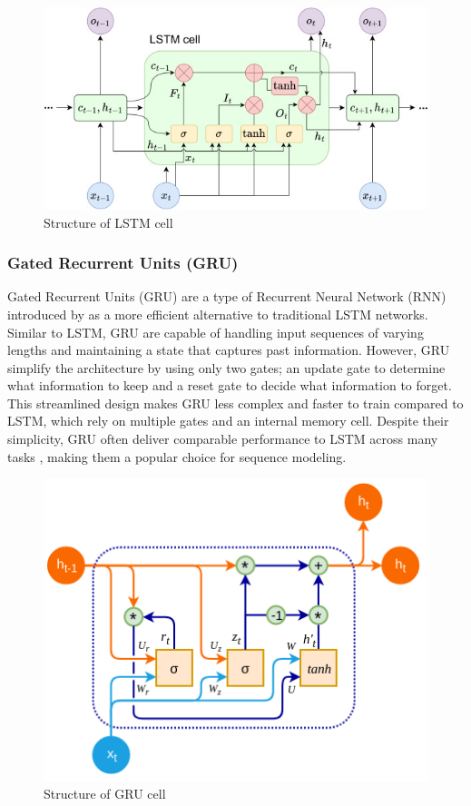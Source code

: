 \documentclass[]{interact}
\theoremstyle{plain}%
\theoremstyle{definition}
\theoremstyle{remark}
\begin{document}
\begin{figure}

{\centering \includegraphics[width=0.75\linewidth]{lstm} 

}

\caption{Structure of LSTM cell}\label{fig:figlstm}
\end{figure}

\subsubsection{Gated Recurrent Units
(GRU)}\label{gated-recurrent-units-gru}

Gated Recurrent Units (GRU) are a type of Recurrent Neural Network (RNN)
introduced by \citep{chung2014} as a more efficient alternative to
traditional LSTM networks. Similar to LSTM, GRU are capable of handling
input sequences of varying lengths and maintaining a state that captures
past information. However, GRU simplify the architecture by using only
two gates; an update gate to determine what information to keep and a
reset gate to decide what information to forget. This streamlined design
makes GRU less complex and faster to train compared to LSTM, which rely
on multiple gates and an internal memory cell. Despite their simplicity,
GRU often deliver comparable performance to LSTM across many tasks
\citep{yang2020}, making them a popular choice for sequence modeling.

\begin{figure}

{\centering \includegraphics[width=0.75\linewidth]{GRU} 

}

\caption{Structure of GRU cell}\label{fig:figgru}
\end{figure}
\end{document}
